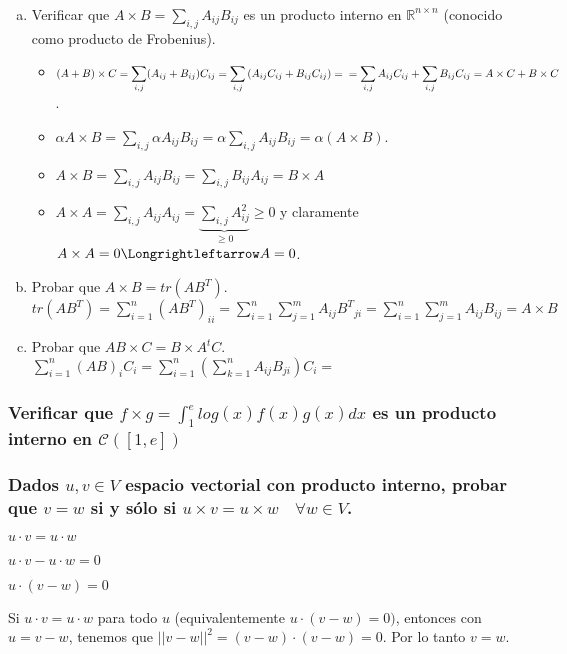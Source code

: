 \documentclass{article}
\begin{document}
\subsubsection{}
\begin{enumerate}[a.]
\item
	Verificar que $\displaystyle A \times B = \sum_{i,j}{A_{ij}B_{ij}}$ es un producto 
	interno en $\mathbb{R}^{n \times n}$
	(conocido como producto de Frobenius).
	\begin{itemize}
	\item
		$\displaystyle (A+B) \times C = \sum_{i,j}({A_{ij}+B_{ij}})C_{ij} = 
		\sum_{i,j}{(A_{ij}C_{ij}+B_{ij}C_{ij})} =  \\
		= \sum_{i,j}{A_{ij}C_{ij}} + \sum_{i,j}{B_{ij}C_{ij}} = A \times C + B \times C$.
	\item
		$\alpha A \times B = \sum_{i,j}{\alpha A_{ij}B_{ij}} = \alpha \sum_{i,j}{A_{ij}B_{ij}} = 
		\alpha (A \times B)$.
	\item
		$A \times B = \sum_{i,j}{A_{ij}B_{ij}} = \sum_{i,j}{B_{ij}A_{ij}} = B \times A$
	\item
		$A \times A = \sum_{i,j}{A_{ij}A_{ij}} = \underbrace{\sum_{i,j}{A_{ij}^2}}_{\geq 0} \geq 0$ y claramente
		$A \times A = 0 \Longrightleftarrow A = 0$.
	\end{itemize}

\item
	Probar que $A \times B = tr(AB^T)$. \\
	$\displaystyle tr(AB^T) = \sum_{i=1}^{n}{(AB^T)_{ii}} = \sum_{i=1}^{n}{\sum_{j=1}^{m}{A_{ij}{B^T}_{ji}}}
	=  \sum_{i=1}^{n}{\sum_{j=1}^{m}{A_{ij}{B}_{ij}}} = A \times B$
\item
	Probar que $AB \times C = B \times A^t C$. \\
	$\displaystyle \sum_{i=1}^{n}{(AB)_iC_i} = \sum_{i=1}^{n}{( \sum_{k=1}^{n}{A_{ij}B_{ji}} )C_i} 
	= $
	
\end{enumerate}

\subsubsection{Verificar que $\displaystyle f \times g = \int_{1}^{e}{log(x)f(x)g(x) dx}$ es un producto interno en
$\mathcal{C}([1,e])$}

\subsubsection{Dados $u,v \in V$ espacio vectorial con producto interno, probar que $v=w$ si y sólo si 
$u \times v = u \times w \quad \forall w \in V$.}
\centerline{$u \cdot v = u \cdot w $}
\centerline{$u \cdot v - u \cdot w = 0$}
\centerline{$u \cdot (v -w ) = 0$}
Si $u \cdot v = u \cdot w$ para todo $u$ (equivalentemente $u \cdot (v-w) = 0)$, entonces con $u=v-w$,
tenemos que $||v-w||^2 = (v-w) \cdot (v-w) = 0$. Por lo tanto $v=w$.
\end{document}
